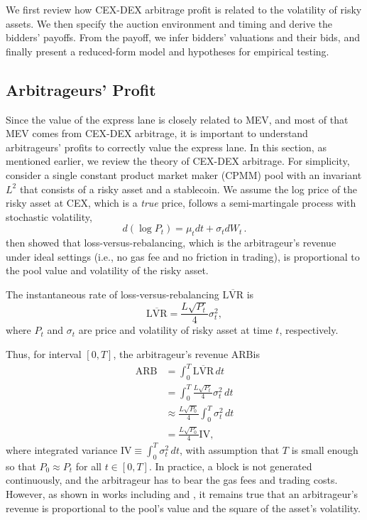 \documentclass[runningheads]{llncs}
\newcommand{\IV}{\mathrm{IV}}
\begin{document}
We first review how CEX-DEX arbitrage profit is related to the volatility of risky assets. We then specify the auction environment and timing and derive the bidders' payoffs. From the payoff, we infer bidders' valuations and their bids, and finally present a reduced-form model and hypotheses for empirical testing.

\subsection{Arbitrageurs' Profit}
Since the value of the express lane is closely related to MEV, and most of that MEV comes from CEX-DEX arbitrage, it is important to understand arbitrageurs' profits to correctly value the express lane. In this section, as mentioned earlier, we review the theory of CEX-DEX arbitrage. For simplicity, consider a single constant product market maker (CPMM) pool with an invariant \(L^2\) that consists of a risky asset and a stablecoin. We assume the log price of the risky asset at CEX, which is a \emph{true} price, follows a semi-martingale process with stochastic volatility, \[
    d\left(\log P_t \right)= \mu_t dt + \sigma_t dW_t \, .
\] \cite{milionis2022automated} then showed that loss-versus-rebalancing, which is the arbitrageur's revenue under ideal settings (i.e., no gas fee and no friction in trading), is proportional to the pool value and volatility of the risky asset.
\begin{prop}
    The instantaneous rate of loss-versus-rebalancing \(\overline{\mathrm{LVR}}\) is \[
    \overline{\mathrm{LVR}} = \frac{L\sqrt{P_t}}{4} \sigma^2_t,
    \] where \(P_t\) and \(\sigma_t\) are price and volatility of risky asset at time \(t\), respectively.
\end{prop}
Thus, for interval \([0,T]\), the arbitrageur's revenue \(\mathrm{ARB}\)is
\begin{align}
    \mathrm{ARB} &= \int^T_0 \overline{\mathrm{LVR}} \, dt \\
        &=  \int^T_0 \frac{L\sqrt{P_t}}{4} \sigma^2_t \, dt \\
        &\approx \frac{L\sqrt{P_0}}{4} \int^T_0 \sigma^2_t \, dt \\
        &= \frac{L\sqrt{P_0}}{4} \IV,
\end{align}
where integrated variance \(\IV \equiv \int^T_0 \sigma^2_t \, dt \), with assumption that \(T\) is small enough so that \(P_0 \approx P_t \) for all \(t \in [0,T]\). In practice, a block is not generated continuously, and the arbitrageur has to bear the gas fees and trading costs. However, as shown in works including \cite{milionis2024automated} and \cite{nezlobin2025loss}, it remains true that an arbitrageur's revenue is proportional to the pool's value and the square of the asset's volatility.
\end{document}

